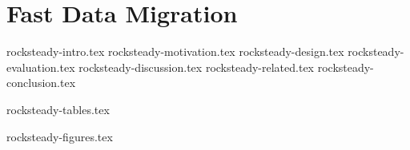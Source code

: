 \chapter{Fast Data Migration}

 {rocksteady-intro.tex}
 {rocksteady-motivation.tex}
 {rocksteady-design.tex}
 {rocksteady-evaluation.tex}
 {rocksteady-discussion.tex}
 {rocksteady-related.tex}
 {rocksteady-conclusion.tex}

\clearpage

 {rocksteady-tables.tex}

\clearpage

 {rocksteady-figures.tex}
